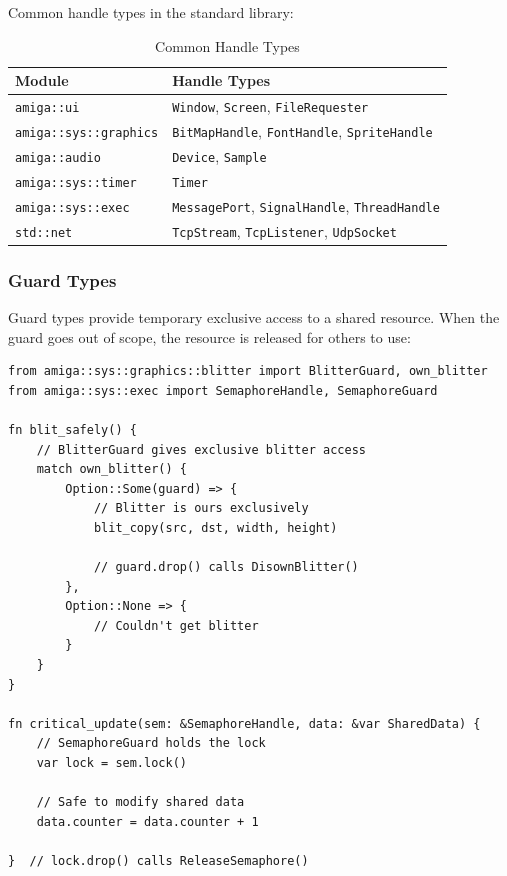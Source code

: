Common handle types in the standard library:

\begin{table}[h]
\centering
\begin{tabular}{ll}
\hline
\textbf{Module} & \textbf{Handle Types} \\
\hline
\texttt{amiga::ui} & \texttt{Window}, \texttt{Screen}, \texttt{FileRequester} \\
\texttt{amiga::sys::graphics} & \texttt{BitMapHandle}, \texttt{FontHandle}, \texttt{SpriteHandle} \\
\texttt{amiga::audio} & \texttt{Device}, \texttt{Sample} \\
\texttt{amiga::sys::timer} & \texttt{Timer} \\
\texttt{amiga::sys::exec} & \texttt{MessagePort}, \texttt{SignalHandle}, \texttt{ThreadHandle} \\
\texttt{std::net} & \texttt{TcpStream}, \texttt{TcpListener}, \texttt{UdpSocket} \\
\hline
\end{tabular}
\caption{Common Handle Types}
\end{table}

\subsubsection{Guard Types}

Guard types provide temporary exclusive access to a shared resource. When the guard goes out of scope, the resource is released for others to use:

\begin{lstlisting}
from amiga::sys::graphics::blitter import BlitterGuard, own_blitter
from amiga::sys::exec import SemaphoreHandle, SemaphoreGuard

fn blit_safely() {
    // BlitterGuard gives exclusive blitter access
    match own_blitter() {
        Option::Some(guard) => {
            // Blitter is ours exclusively
            blit_copy(src, dst, width, height)

            // guard.drop() calls DisownBlitter()
        },
        Option::None => {
            // Couldn't get blitter
        }
    }
}

fn critical_update(sem: &SemaphoreHandle, data: &var SharedData) {
    // SemaphoreGuard holds the lock
    var lock = sem.lock()

    // Safe to modify shared data
    data.counter = data.counter + 1

}  // lock.drop() calls ReleaseSemaphore()
\end{lstlisting}

